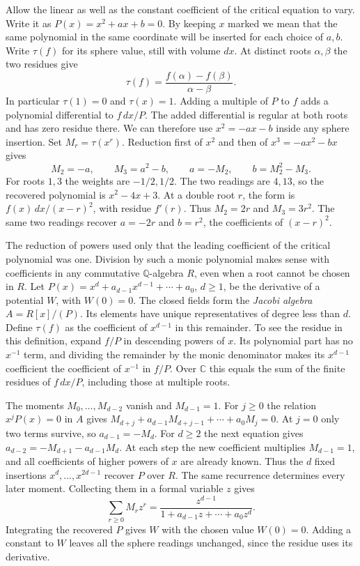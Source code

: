 \documentclass{momentum}
\begin{document}
Allow the linear as well as the constant coefficient of the critical
equation to vary. Write it as
\(P(x)=x^2+ax+b=0\). By keeping \(x\) marked we mean that the same
polynomial in the same coordinate will be inserted for each choice of
\(a,b\). Write \(\tau(f)\) for its sphere value, still with volume \(dx\).
At distinct roots \(\alpha,\beta\) the two residues give
\[
  \tau(f)=\frac{f(\alpha)-f(\beta)}{\alpha-\beta}.
\]
In particular \(\tau(1)=0\) and \(\tau(x)=1\). Adding a multiple of \(P\)
to \(f\) adds a polynomial differential to \(f\,dx/P\). The added
differential is regular at both roots and has zero residue there. We can therefore use \(x^2=-ax-b\) inside any
sphere insertion. Set \(M_r=\tau(x^r)\). Reduction first of \(x^2\) and
then of \(x^3=-ax^2-bx\) gives
\[
 M_2=-a,\qquad M_3=a^2-b,\qquad
 a=-M_2,\qquad b=M_2^2-M_3 .
\]
For roots \(1,3\) the weights are \(-1/2,1/2\). The two readings are
\(4,13\), so the recovered polynomial is \(x^2-4x+3\). At a double root \(r\), the form is \(f(x)\,dx/(x-r)^2\), with residue
\(f'(r)\). Thus \(M_2=2r\) and \(M_3=3r^2\). The same two readings
recover \(a=-2r\) and \(b=r^2\), the coefficients of \((x-r)^2\).

The reduction of powers used only that the leading coefficient of the
critical polynomial was one. Division by such a monic polynomial makes
sense with coefficients in any commutative \(\mathbb Q\)-algebra \(R\),
even when a root cannot be chosen in \(R\). Let
\(P(x)=x^d+a_{d-1}x^{d-1}+\cdots+a_0\), \(d\ge1\), be the derivative
of a potential \(W\), with \(W(0)=0\). The closed fields form the
\emph{Jacobi algebra} \(A=R[x]/(P)\). Its elements have unique
representatives of degree less than \(d\). Define \(\tau(f)\) as the
coefficient of \(x^{d-1}\) in this remainder. To see the residue in this
definition, expand \(f/P\) in descending powers of \(x\). Its polynomial
part has no \(x^{-1}\) term, and dividing the remainder by the monic
denominator makes its \(x^{d-1}\) coefficient the coefficient of
\(x^{-1}\) in \(f/P\). Over \(\mathbb C\) this equals the sum of the
finite residues of \(f\,dx/P\), including those at multiple roots.

The moments \(M_0,\ldots,M_{d-2}\) vanish and \(M_{d-1}=1\).
For \(j\ge0\) the relation \(x^jP(x)=0\) in \(A\) gives
\(M_{d+j}+a_{d-1}M_{d+j-1}+\cdots+a_0M_j=0\).
At \(j=0\) only two terms survive, so \(a_{d-1}=-M_d\).
For \(d\ge2\) the next equation gives
\(a_{d-2}=-M_{d+1}-a_{d-1}M_d\).
At each step the new coefficient multiplies \(M_{d-1}=1\), and all
coefficients of higher powers of \(x\) are already known. Thus the
\(d\) fixed insertions \(x^d,\ldots,x^{2d-1}\) recover \(P\) over \(R\).
The same recurrence determines every later moment. Collecting them in
a formal variable \(z\) gives
\begin{equation}
 \sum_{r\ge0} M_r z^r
  =\frac{z^{d-1}}{1+a_{d-1}z+\cdots+a_0z^d}.
 \label{eq:moments}
\end{equation}
Integrating the recovered \(P\) gives \(W\) with the chosen value
\(W(0)=0\). Adding a constant to \(W\) leaves all the sphere readings
unchanged, since the residue uses its derivative.
\end{document}
